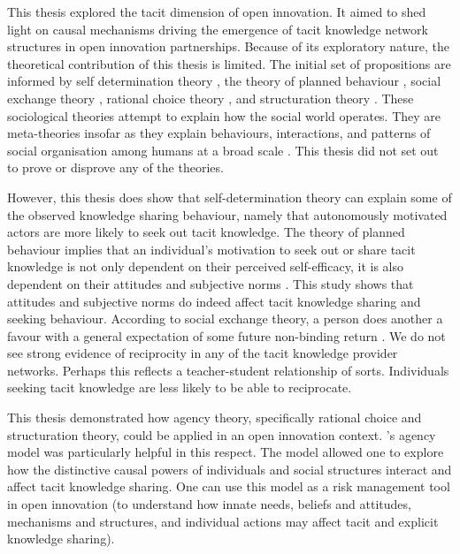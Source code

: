This thesis explored the tacit dimension of open innovation. It aimed to shed light on causal mechanisms driving the emergence of tacit knowledge network structures in open innovation partnerships. Because of its exploratory nature, the theoretical contribution of this thesis is limited. The initial set of propositions are informed by self determination theory \citep{deci1985conceptualizations}, the theory of planned behaviour \citep{ajzen1985intentions}, social exchange theory \citep{homans1961social,blau1964exchange}, rational choice theory \citep{parsons1937structure,coleman1990foundations}, and structuration theory \citep{giddens1984constitution}. These sociological theories attempt to explain how the social world operates. They are meta-theories insofar as they explain behaviours, interactions, and patterns of social organisation among humans at a broad scale \citep{turner2012nature}. This thesis did not set out to prove or disprove any of the theories. \medskip

However, this thesis does show that self-determination theory can explain some of the observed knowledge sharing behaviour, namely that autonomously motivated actors are more likely to seek out tacit knowledge. The theory of planned behaviour implies that an individual's motivation to seek out or share tacit knowledge is not only dependent on their perceived self-efficacy, it is also dependent on their attitudes and subjective norms \citep{gagne2009model}. This study shows that attitudes and subjective norms do indeed affect tacit knowledge sharing and seeking behaviour. According to social exchange theory, a person does another a favour with a general expectation of some future non-binding return \citep{homans1961social}. We do not see strong evidence of reciprocity in any of the tacit knowledge provider networks. Perhaps this reflects a teacher-student relationship of sorts. Individuals seeking tacit knowledge are less likely to be able to reciprocate. \medskip

This thesis demonstrated how agency theory, specifically rational choice and structuration theory, could be applied in an open innovation context. \citeauthor{loyal2001agency}'s \citeyearpar{loyal2001agency} agency model was particularly helpful in this respect. The model allowed one to explore how the distinctive causal powers of individuals and social structures interact and affect tacit knowledge sharing. One can use this model as a risk management tool in open innovation (to understand how innate needs, beliefs and attitudes, mechanisms and structures, and individual actions may affect tacit and explicit knowledge sharing). \medskip

